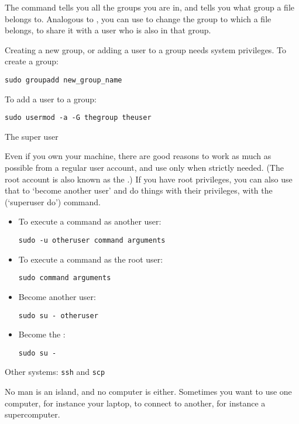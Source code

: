 The command 
tells you all the groups you are in, and  tells you
what group a file belongs to. Analogous to ,
you can use  to change the group to
which a file belongs, to share it with a user who is also in that group.

Creating a new group, or
adding a user to a group needs system privileges.
To create a group:
\begin{verbatim}
sudo groupadd new_group_name
\end{verbatim}
To add a user to a group:
\begin{verbatim}
sudo usermod -a -G thegroup theuser
\end{verbatim}

 {The super user}

Even if you own your machine, there are good reasons to work as much
as possible from a regular user account, and use
 only when strictly needed.
%
(The root account is also known as the .)
%
If you have root privileges, you can also use that to `become another
user' and do things with their privileges, with the
 (`superuser do') command.

\begin{itemize}
\item To execute a command as another user:
\begin{verbatim}
sudo -u otheruser command arguments
\end{verbatim}
\item To execute a command as the root user:
\begin{verbatim}
sudo command arguments
\end{verbatim}
\item Become another user:
\begin{verbatim}
sudo su - otheruser
\end{verbatim}
\item Become the :
\begin{verbatim}
sudo su -
\end{verbatim}
\end{itemize}

 {Other systems: {\tt ssh} and {\tt scp}}

No man is an island, and no computer is either. Sometimes you want to
use one computer, for instance your laptop, to connect to another, for
instance a supercomputer.

